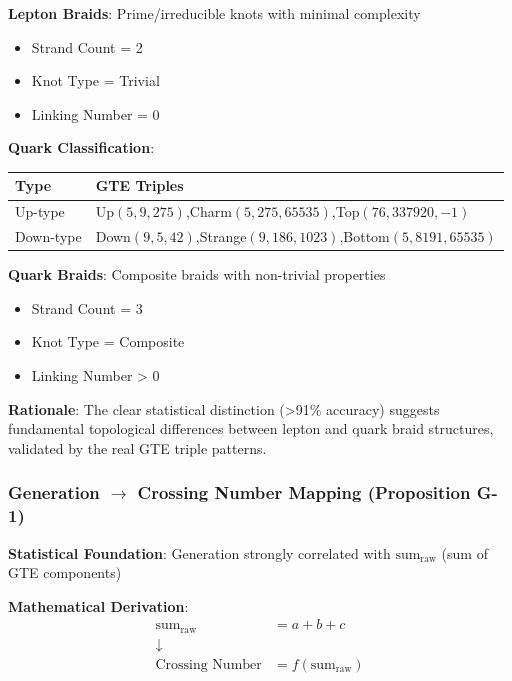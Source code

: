 \documentclass[11pt]{article}
\theoremstyle{remark}
\begin{document}
\textbf{Lepton Braids}: Prime/irreducible knots with minimal complexity
\begin{itemize}
    \item Strand Count = 2
    \item Knot Type = Trivial  
    \item Linking Number = 0
\end{itemize}

\textbf{Quark Classification}:
\begin{table}[H]
\centering
\renewcommand{\arraystretch}{1.3}
\begin{tabularx}{\textwidth}{@{}l X@{}}
\toprule
\textbf{Type} & \textbf{GTE Triples} \\
\midrule
Up-type   & Up$(5,9,275)$,\quad Charm$(5,275,65535)$,\quad Top$(76,337920,-1)$ \\
Down-type & Down$(9,5,42)$,\quad Strange$(9,186,1023)$,\quad Bottom$(5,8191,65535)$ \\
\bottomrule
\end{tabularx}
\end{table}

\textbf{Quark Braids}: Composite braids with non-trivial properties
\begin{itemize}
    \item Strand Count = 3
    \item Knot Type = Composite
    \item Linking Number > 0
\end{itemize}

\textbf{Rationale}: The clear statistical distinction (>91\% accuracy) suggests fundamental topological differences between lepton and quark braid structures, validated by the real GTE triple patterns.

\subsubsection{Generation $\rightarrow$ Crossing Number Mapping (Proposition G-1)}

\textbf{Statistical Foundation}: Generation strongly correlated with $\text{sum}_{\text{raw}}$ (sum of GTE components)

\textbf{Mathematical Derivation}:
\begin{align}
\text{sum}_{\text{raw}} &= a + b + c \\
\downarrow \\
\text{Crossing Number} &= f(\text{sum}_{\text{raw}})
\end{align}
\end{document}
